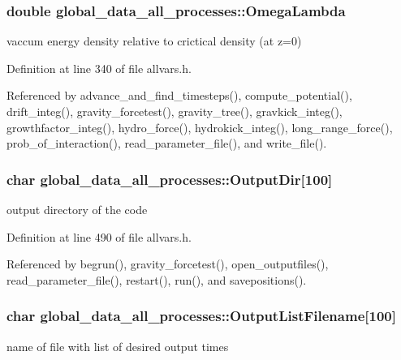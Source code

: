 \hypertarget{structglobal__data__all__processes_ae272abeafbcb16230374a903a3e4e298}{
\subsubsection[{OmegaLambda}]{\setlength{\rightskip}{0pt plus 5cm}double {\bf global\_\-data\_\-all\_\-processes::OmegaLambda}}}
\label{structglobal__data__all__processes_ae272abeafbcb16230374a903a3e4e298}
vaccum energy density relative to crictical density (at z=0) 

Definition at line 340 of file allvars.h.



Referenced by advance\_\-and\_\-find\_\-timesteps(), compute\_\-potential(), drift\_\-integ(), gravity\_\-forcetest(), gravity\_\-tree(), gravkick\_\-integ(), growthfactor\_\-integ(), hydro\_\-force(), hydrokick\_\-integ(), long\_\-range\_\-force(), prob\_\-of\_\-interaction(), read\_\-parameter\_\-file(), and write\_\-file().

\hypertarget{structglobal__data__all__processes_aebda5d1b80cfb767b9668d7858c36bcc}{
\subsubsection[{OutputDir}]{\setlength{\rightskip}{0pt plus 5cm}char {\bf global\_\-data\_\-all\_\-processes::OutputDir}\mbox{[}100\mbox{]}}}
\label{structglobal__data__all__processes_aebda5d1b80cfb767b9668d7858c36bcc}
output directory of the code 

Definition at line 490 of file allvars.h.



Referenced by begrun(), gravity\_\-forcetest(), open\_\-outputfiles(), read\_\-parameter\_\-file(), restart(), run(), and savepositions().

\hypertarget{structglobal__data__all__processes_a063be13ecadec873ebaad1b3645a5323}{
\subsubsection[{OutputListFilename}]{\setlength{\rightskip}{0pt plus 5cm}char {\bf global\_\-data\_\-all\_\-processes::OutputListFilename}\mbox{[}100\mbox{]}}}
\label{structglobal__data__all__processes_a063be13ecadec873ebaad1b3645a5323}
name of file with list of desired output times 

